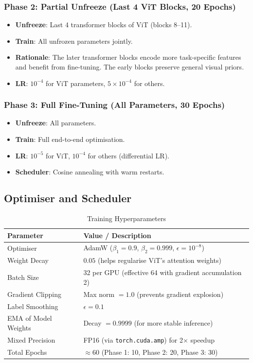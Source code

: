 \documentclass[12pt,a4paper]{article}
\begin{document}
\subsubsection{Phase 2: Partial Unfreeze (Last 4 ViT Blocks, 20 Epochs)}

\begin{itemize}[leftmargin=1.5em]
  \item \textbf{Unfreeze}: Last 4 transformer blocks of ViT (blocks 8--11).
  \item \textbf{Train}: All unfrozen parameters jointly.
  \item \textbf{Rationale}: The later transformer blocks encode more task-specific features
    and benefit from fine-tuning. The early blocks preserve general visual priors.
  \item \textbf{LR}: $10^{-4}$ for ViT parameters, $5 \times 10^{-4}$ for others.
\end{itemize}

\subsubsection{Phase 3: Full Fine-Tuning (All Parameters, 30 Epochs)}

\begin{itemize}[leftmargin=1.5em]
  \item \textbf{Unfreeze}: All parameters.
  \item \textbf{Train}: Full end-to-end optimisation.
  \item \textbf{LR}: $10^{-5}$ for ViT, $10^{-4}$ for others (differential LR).
  \item \textbf{Scheduler}: Cosine annealing with warm restarts.
\end{itemize}

\subsection{Optimiser and Scheduler}

\begin{table}[h]
\centering
\caption{Training Hyperparameters}
\begin{tabularx}{\textwidth}{lX}
\toprule
\textbf{Parameter} & \textbf{Value / Description} \\
\midrule
Optimiser & AdamW ($\beta_1 = 0.9$, $\beta_2 = 0.999$, $\epsilon = 10^{-8}$) \\
Weight Decay & $0.05$ (helps regularise ViT's attention weights) \\
Batch Size & 32 per GPU (effective 64 with gradient accumulation 2) \\
Gradient Clipping & Max norm $= 1.0$ (prevents gradient explosion) \\
Label Smoothing & $\epsilon = 0.1$ \\
EMA of Model Weights & Decay $= 0.9999$ (for more stable inference) \\
Mixed Precision & FP16 (via \texttt{torch.cuda.amp}) for 2$\times$ speedup \\
Total Epochs & $\approx 60$ (Phase 1: 10, Phase 2: 20, Phase 3: 30) \\
\bottomrule
\end{tabularx}
\end{table}
\end{document}
